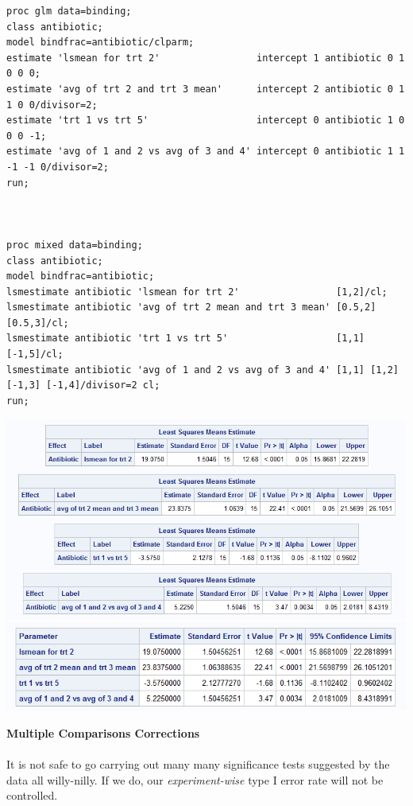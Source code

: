 \begin{small}
\begin{verbatim}
proc glm data=binding;
class antibiotic;
model bindfrac=antibiotic/clparm;
estimate 'lsmean for trt 2'                 intercept 1 antibiotic 0 1 0 0 0;
estimate 'avg of trt 2 and trt 3 mean'      intercept 2 antibiotic 0 1 1 0 0/divisor=2;
estimate 'trt 1 vs trt 5'                   intercept 0 antibiotic 1 0 0 0 -1;
estimate 'avg of 1 and 2 vs avg of 3 and 4' intercept 0 antibiotic 1 1 -1 -1 0/divisor=2;
run;



proc mixed data=binding;
class antibiotic;
model bindfrac=antibiotic;
lsmestimate antibiotic 'lsmean for trt 2'                 [1,2]/cl;
lsmestimate antibiotic 'avg of trt 2 mean and trt 3 mean' [0.5,2] [0.5,3]/cl;
lsmestimate antibiotic 'trt 1 vs trt 5'                   [1,1] [-1,5]/cl;
lsmestimate antibiotic 'avg of 1 and 2 vs avg of 3 and 4' [1,1] [1,2] [-1,3] [-1,4]/divisor=2 cl;
run;
\end{verbatim}
\end{small}

\newpage

\begin{center}
\includegraphics[scale=0.8]{BindFracMixedEstimate}\\
\includegraphics[scale=0.8]{BindFracGLMEstimate}
\end{center}

\newpage

\textbf{Multiple Comparisons Corrections}\\~\\
It is not safe to go carrying out many many significance tests suggested by the data all willy-nilly.  If we do, our \textit{experiment-wise} type I error rate will not be controlled.\\~\\

